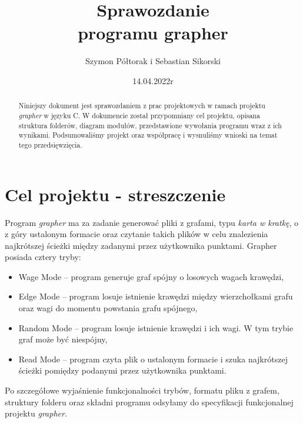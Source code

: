\documentclass[10pt, a4paper]{report}
\title{\huge{\textbf{Sprawozdanie} \\ programu grapher}}
\author{Szymon Półtorak i Sebastian Sikorski}
\date{14.04.2022r}
\begin{document}
    \maketitle

    \renewcommand*\thesection{\arabic{section}}
    
    \begin{abstract}
        Niniejszy dokument jest sprawozdaniem z prac projektowych w ramach projektu \textit{grapher} w języku C.
        W dokumencie został przypomniany cel projektu, opisana struktura folderów, diagram modułów, przedstawione
        wywołania programu wraz z ich wynikami. Podsumowaliśmy projekt oraz współpracę i wysnuliśmy wnioski na temat tego przedsięwzięcia.
    \end{abstract}

    \pagestyle{fancy}
    \fancyhf{}
    
    \tableofcontents
    \newpage

    \section{Cel projektu - streszczenie}
    Program \textit{grapher} ma za zadanie generować pliki z grafami, typu \textit{karta w kratkę}, o z góry ustalonym formacie oraz czytanie takich plików w celu znalezienia najkrótszej ścieżki między zadanymi
    przez użytkownika punktami. Grapher posiada cztery tryby:
    \begin{itemize}
        \item Wage Mode – program generuje graf spójny o losowych wagach krawędzi,
        \item Edge Mode – program losuje istnienie krawędzi między wierzchołkami grafu oraz wagi do
        momentu powstania grafu spójnego,
        \item Random Mode – program losuje istnienie krawędzi i ich wagi. W tym trybie graf może być niespójny,
        \item Read Mode – program czyta plik o ustalonym formacie i szuka najkrótszej ścieżki pomiędzy podanymi przez użytkownika punktami.        
    \end{itemize}
    Po szczegółowe wyjaśnienie funkcjonalności trybów, formatu pliku z grafem, struktury folderu oraz składni programu odsyłamy do specyfikacji funkcjonalnej projektu \textit{grapher}.
\end{document}
